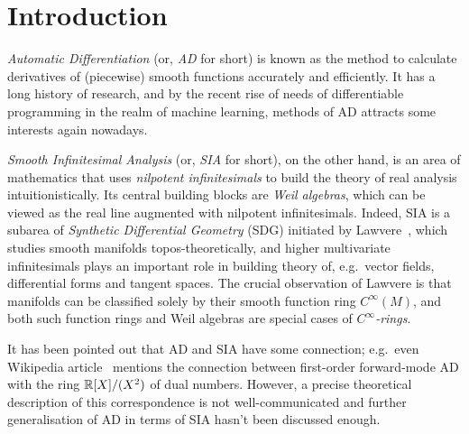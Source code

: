 \documentclass[%
  sigconf,authorversion,screen]{acmart}
\begin{document}
  

\maketitle

\section{Introduction}\label{sec:intro}
\sloppy
\emph{Automatic Differentiation} (or, \emph{AD} for short) is known as the method to calculate derivatives of (piecewise) smooth functions accurately and efficiently.
It has a long history of research, and by the recent rise of needs of differentiable programming in the realm of machine learning, methods of AD attracts some interests again nowadays.

\emph{Smooth Infinitesimal Analysis} (or, \emph{SIA} for short), on the other hand, is an area of mathematics that uses \emph{nilpotent infinitesimals} to build the theory of real analysis intuitionistically.
Its central building blocks are \emph{Weil algebras}, which can be viewed as the real line augmented with nilpotent infinitesimals.
Indeed, SIA is a subarea of \emph{Synthetic Differential Geometry} (SDG) initiated by Lawvere~\cite{lawvere1979categorical}, which studies smooth manifolds topos-theoretically, and higher multivariate infinitesimals plays an important role in building theory of, e.g.\ vector fields, differential forms and tangent spaces.
The crucial observation of Lawvere is that manifolds can be classified solely by their smooth function ring $C^\infty(M)$, and both such function rings and Weil algebras are special cases of \emph{$C^\infty$-rings}.

It has been pointed out that AD and SIA have some connection; e.g.\ even Wikipedia article~\cite{Wikipedia:2021aa} mentions the connection between first-order forward-mode AD with the ring $\mathbb{R}[X]/(X^2)$ of dual numbers.
However, a precise theoretical description of this correspondence is not well-communicated and further generalisation of AD in terms of SIA hasn't been discussed enough.
\end{document}
